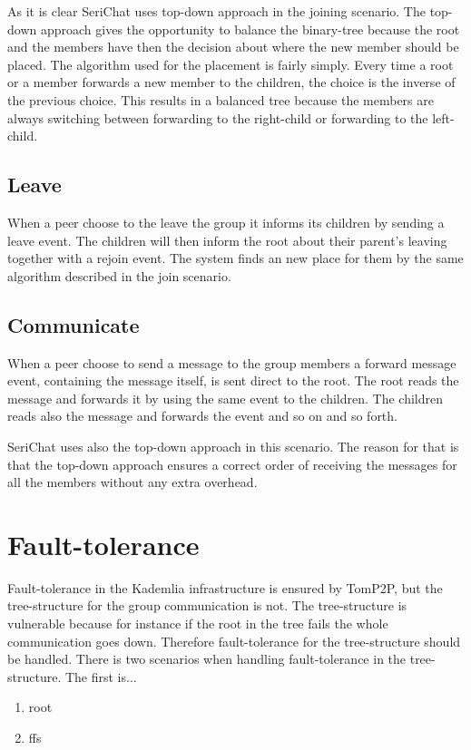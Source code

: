 As it is clear SeriChat uses top-down approach in the joining scenario. The top-down approach gives the opportunity to balance the binary-tree because the root and the members have then the decision about where the new member should be placed. The algorithm used for the placement is fairly simply. Every time a root or a member forwards a new member to the children, the choice is the inverse of the previous choice. This results in a balanced tree because the members are always switching between forwarding to the right-child or forwarding to the left-child.

\subsection{Leave}
When a peer choose to the leave the group it informs its children by sending a leave event. The children will then inform the root about their parent's leaving together with a rejoin event. The system finds an new place for them by the same algorithm described in the join scenario.

\subsection{Communicate}
When a peer choose to send a message to the group members a forward message event, containing the message itself,  is sent direct to the root. The root reads the message and forwards it by using the same event to the children. The children reads also the message and forwards the event and so on and so forth.

SeriChat uses also the top-down approach in this scenario. The reason for that is that the top-down approach ensures a correct order of receiving the messages for all the members without any extra overhead.

\section{Fault-tolerance}
Fault-tolerance in the Kademlia infrastructure is ensured by TomP2P, but the tree-structure for the group communication is not. The tree-structure is vulnerable because for instance if the root in the tree fails the whole communication goes down. Therefore fault-tolerance for the tree-structure should be handled. There is two scenarios when handling fault-tolerance in the tree-structure. The first is... 
\begin{enumerate}
	\item root
	\item ffs
\end{enumerate}

